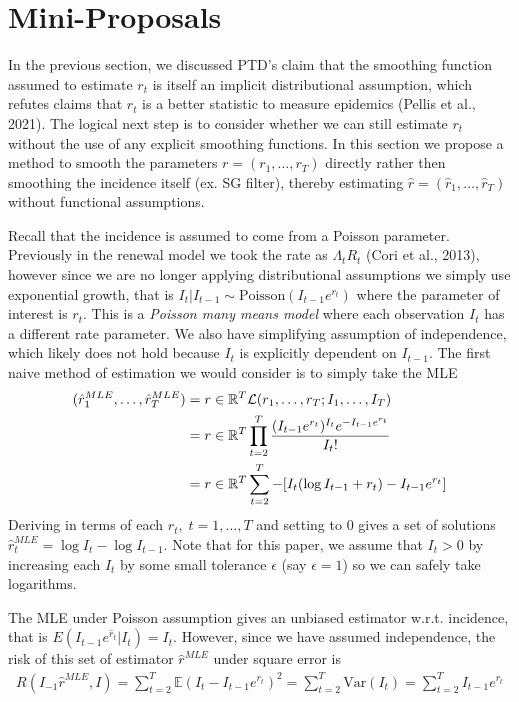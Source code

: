 \documentclass[12pt]{article}
\let\argmin\relax\DeclareMathOperator*{\argmin}{argmin}
\let\argmax\relax\DeclareMathOperator*{\argmax}{argmax}
\begin{document}
  \section{Mini-Proposals}
      In the previous section, we discussed PTD's claim that the smoothing function assumed to estimate $r_t$ is itself an implicit
      distributional assumption, which refutes claims that $r_t$ is a better statistic to measure epidemics (Pellis et al., 2021). 
      The logical next step is to consider whether we can still estimate $r_t$ without the use of any explicit smoothing functions.
      In this section we propose a method to smooth the parameters $r = (r_1,\dots,r_T)$ directly rather then smoothing the
      incidence itself (ex. SG filter), thereby estimating $\hat{r} = (\hat{r}_1,\dots,\hat{r}_T)$ without functional assumptions. 

      Recall that the incidence is assumed to come from a Poisson parameter. Previously in the renewal model we took the rate as
      $\Lambda_t R_t$ (Cori et al., 2013), however since we are no longer applying distributional assumptions we simply
      use exponential growth, that is $I_t|I_{t-1} \sim \text{Poisson}(I_{t - 1}e^{r_t})$ where the parameter of interest is $r_t$.
      This is a \textit{Poisson many means model} where each observation $I_t$ has a different rate parameter. We also have 
      simplifying assumption of independence, which likely does not hold because $I_t$ is explicitly dependent on $I_{t - 1}$.
      The first naive method of estimation we would consider is to simply take the MLE
      \begin{align} \label{rt: MLE}
          (\hat{r}_1^{MLE},\dots,\hat{r}_T^{MLE}) &= \argmax{r \in \mathbb{R}^T} \mathcal{L}(r_1,\dots,r_T ; I_1,\dots,I_T) \\
          &= \argmax{r \in \mathbb{R}^T} \prod_{t = 2}^T \frac{(I_{t - 1}e^{r_t})^{I_t} e^{-I_{t - 1}e^{r_t}}}{I_t!} \\
          &= \argmin{r \in \mathbb{R}^T} \sum_{t = 2}^T -[I_t(\log{I_{t - 1}} + r_t) - I_{t - 1}e^{r_t}]
      \end{align}
      Deriving in terms of each $r_t, \; t=1,\dots,T$ and setting to 0 gives a set of solutions \\ 
      $\hat{r}_t^{MLE} = \log{I_t} - \log{I_{t - 1}}$. Note that for this paper, we assume that 
      $I_t > 0$ by increasing each $I_t$ by some small tolerance $\epsilon$ (say $\epsilon = 1$) so we can safely take logarithms.

      The MLE under Poisson assumption gives an unbiased estimator w.r.t. incidence, that is $E(I_{t - 1}e^{\hat{r}_t} | I_t) = I_t$. 
      However, since we have assumed independence, the risk of this set of estimator $\hat{r}^{MLE}$ under square error is
      \begin{align}
        R(I_{-1}\hat{r}^{MLE}, I) = \sum_{t = 2}^T \mathbb{E}(I_t - I_{t - 1}e^{r_t})^2 = \sum_{t = 2}^T \text{Var}(I_t) = \sum_{t = 2}^T I_{t - 1}e^{r_t}
      \end{align}
\end{document}
